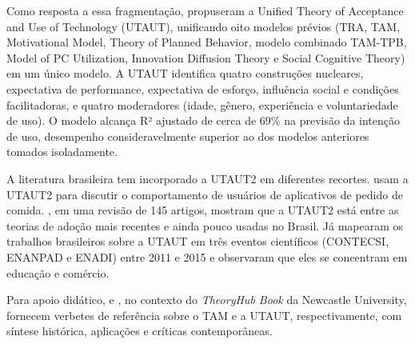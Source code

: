 Como resposta a essa fragmentação,  propuseram a Unified Theory of Acceptance and Use of Technology (UTAUT), unificando oito modelos prévios (TRA, TAM, Motivational Model, Theory of Planned Behavior, modelo combinado TAM-TPB, Model of PC Utilization, Innovation Diffusion Theory e Social Cognitive Theory) em um único modelo. A UTAUT identifica quatro construções nucleares, expectativa de performance, expectativa de esforço, influência social e condições facilitadoras, e quatro moderadores (idade, gênero, experiência e voluntariedade de uso). O modelo alcança R² ajustado de cerca de 69\% na previsão da intenção de uso, desempenho consideravelmente superior ao dos modelos anteriores tomados isoladamente.

A literatura brasileira tem incorporado a UTAUT2 em diferentes recortes.  usam a UTAUT2 para discutir o comportamento de usuários de aplicativos de pedido de comida. , em uma revisão de 145 artigos, mostram que a UTAUT2 está entre as teorias de adoção mais recentes e ainda pouco usadas no Brasil. Já  mapearam os trabalhos brasileiros sobre a UTAUT em três eventos científicos (CONTECSI, ENANPAD e ENADI) entre 2011 e 2015 e observaram que eles se concentram em educação e comércio.

Para apoio didático,  e , no contexto do \emph{TheoryHub Book} da Newcastle University, fornecem verbetes de referência sobre o TAM e a UTAUT, respectivamente, com síntese histórica, aplicações e críticas contemporâneas.

